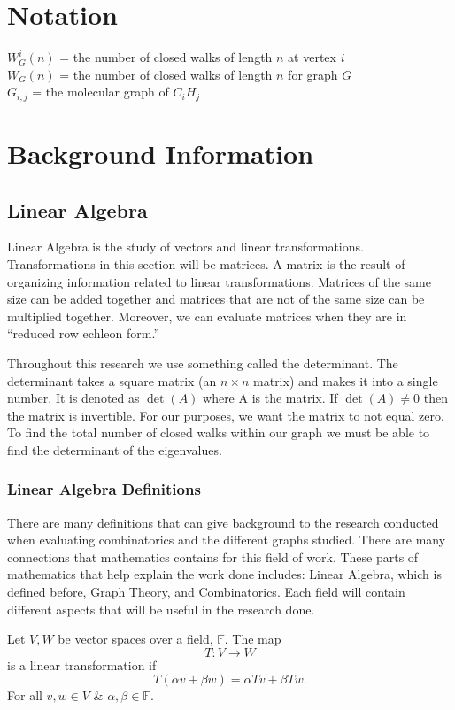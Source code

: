 
\chapter*{Notation}
$W_G^i(n)$ = the number of closed walks of length $n$ at vertex $i$\\
$W_G(n)$ = the number of closed walks of length $n$ for graph $G$ \\
$G_{i,j}$ = the molecular graph of $C_iH_j$
\chapter{Background Information}
\section{Linear Algebra}
Linear Algebra is the study of vectors and linear transformations. Transformations in this section will be matrices. A matrix is the result of organizing information related to linear transformations. Matrices of the same size can be added together and matrices that are not of the same size can be multiplied together.  Moreover, we can evaluate matrices when they are in ``reduced row echleon form.''
\par Throughout this research we use something called the determinant.  The determinant takes a square matrix (an $n\times n$ matrix) and makes it into a single number.  It is denoted as $\det(A)$ where A is the matrix.  If $\det(A)\neq0$ then the matrix is invertible.  For our purposes, we want the matrix to not equal zero.  To find the total number of closed walks within our graph we must be able to find the determinant of the eigenvalues.
\subsection{Linear Algebra Definitions}
There are many definitions that can give background to the research conducted when evaluating combinatorics and the different graphs studied.  There are many connections that mathematics contains for this field of work.  These parts of mathematics that help explain the work done includes: Linear Algebra, which is defined before, Graph Theory, and Combinatorics. Each field will contain different aspects that will be useful in the research done.  
\theoremstyle{definition}
\newtheorem{exmp}{Example}[section]
\begin{definition}
Let $V, W$ be vector spaces over a field, $\mathbb{F}$. The map
    $$T: V \rightarrow W$$ is a linear transformation if $$T(\alpha v + \beta w) = \alpha Tv + \beta Tw.$$ For all $v, w \in V$ \& $\alpha, \beta \in \mathbb{F}$.
\end{definition}

